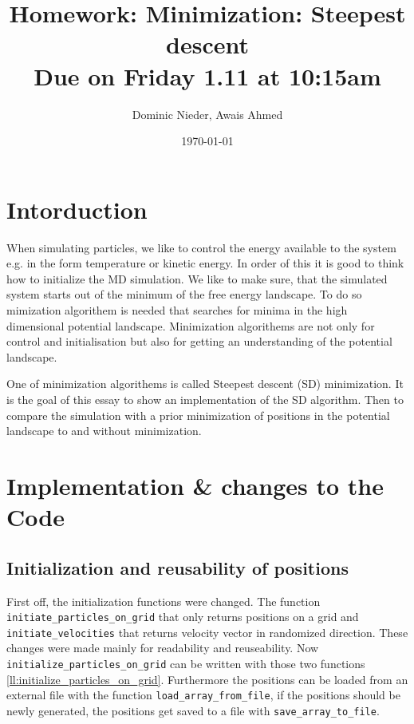 \documentclass{article}
\title{
    \vspace{2in}
    \textmd{\textbf{Homework: Minimization: Steepest descent}}\\
    \normalsize\vspace{0.1in}\small{Due on Friday 1.11 at 10:15am}\\
    \vspace{0.1in}
    \vspace{3in}
}
\author{Dominic Nieder, Awais Ahmed}
\date{\today}
\begin{document}
\maketitle

\section{Intorduction}
When simulating particles, we like to control the energy available to the system e.g. in the form temperature or kinetic energy. In order of this it is good to think how to initialize the MD simulation. We like to make sure, that the simulated system starts out of the minimum of the free energy landscape. To do so mimization algorithem is needed that searches for minima in the high dimensional potential landscape. Minimization algorithems are not only for control and initialisation but also for getting an understanding of the potential landscape.

One of minimization algorithems is called Steepest descent (SD) minimization. It is the goal of this essay to show an implementation of the SD algorithm. Then to compare the simulation with a prior minimization of positions in the potential landscape to and without minimization.  

\section{Implementation \& changes to the Code}


\subsection{Initialization and reusability of positions}
First off, the initialization functions were changed. The function \texttt{initiate\_particles\_on\_grid} that only returns positions on a grid and \texttt{initiate\_velocities} that returns velocity vector in randomized direction. These changes were made mainly for readability and reuseability. Now \texttt{initialize\_particles\_on\_grid} can be written with those two functions \ref{ll:initialize_particles_on_grid}. Furthermore the positions can be loaded from an external file with the function \texttt{load\_array\_from\_file}, if the positions should be newly generated, the positions get saved to a file with \texttt{save\_array\_to\_file}.
\end{document}
